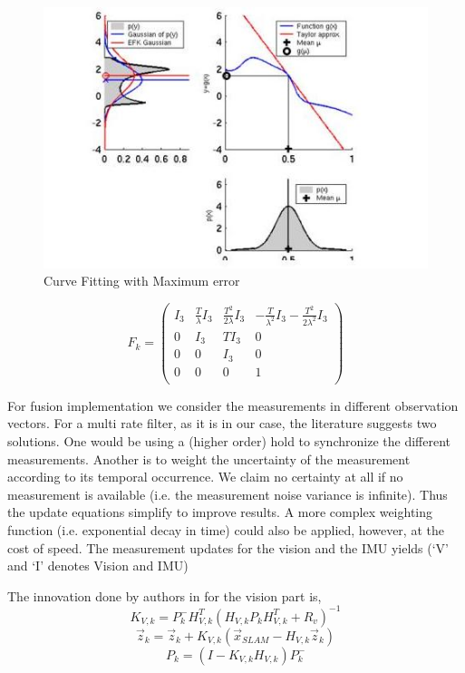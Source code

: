 \begin{figure}[!htb]
\includegraphics[width=\textwidth]{./figures/NonLinear.jpg}
\caption{Curve Fitting with Maximum error ~\cite{ByBo2015}}
\end{figure}




\begin{equation}
F_k= 
 \begin{pmatrix}
  I_3 & \frac{T}{\lambda}I_3  & \frac{T^2}{2 \lambda} I_3& -\frac{T}{ \lambda^2} I_3 - \frac{T^2}{ 2 \lambda^2} I_3\\
  0 & I_3 & T I_3 & 0 \\
  0 & 0 & I_3 & 0 \\
  0 & 0 & 0 & 1\\
 \end{pmatrix} 
\end{equation}

For fusion implementation we consider the measurements in different observation
vectors. For a multi rate filter, as it is in our case, the literature suggests two solutions. One would be using a (higher order) hold to synchronize the different measurements. Another is to weight the uncertainty of the measurement according to its temporal occurrence. We claim no certainty at all if no
measurement is available (i.e. the measurement noise variance is infinite). Thus the update equations simplify to improve results. A more complex weighting function (i.e. exponential decay in time) could also be applied, however, at the cost of speed. The measurement updates for the vision and the IMU yields (‘V’ and ‘I’ denotes Vision and IMU)

The innovation done by authors in for the vision part is,
\begin{equation}
K_{V,k}=P_k^- H_{V,k}^T (H_{V,k} P_k H_{V,k}^T +R_v)^{-1}
\end{equation}
\begin{equation}
\overrightarrow{z}_{k}=\overrightarrow{z}_{k}+K_{V,k}(\overrightarrow{x}_{SLAM}-H_{V,k} \overrightarrow{z}_{k})
\end{equation}
\begin{equation}
P_k=(I-K_{V,k} H_{V,k}) P_k^-
\end{equation}

